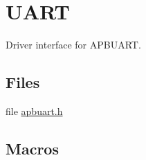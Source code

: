 \hypertarget{group__uart}{}\section{U\+A\+RT}
\label{group__uart}


Driver interface for A\+P\+B\+U\+A\+RT.  


\subsection*{Files}
\begin{DoxyCompactItemize}
\item 
file \mbox{\hyperlink{apbuart_8h}{apbuart.\+h}}
\end{DoxyCompactItemize}
\subsection*{Macros}
